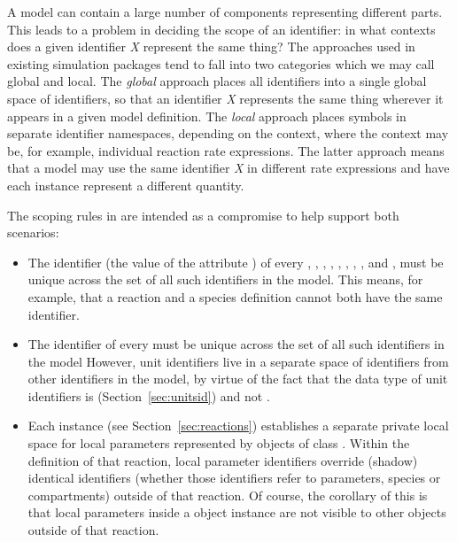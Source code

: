 A model can contain a large number of components representing
different parts.  This leads to a problem in deciding the scope of
an identifier: in what contexts does a given identifier \emph{X}
represent the same thing?  The approaches used in existing
simulation packages tend to fall into two categories which we may
call global and local.  The \emph{global} approach places all
identifiers into a single global space of identifiers, so that an
identifier \emph{X} represents the same thing wherever it appears
in a given model definition.  The \emph{local} approach places
symbols in separate identifier namespaces, depending on the
context, where the context may be, for example, individual
reaction rate expressions.  The latter approach means that a model
may use the same identifier \emph{X} in different rate expressions
and have each instance represent a different quantity.

The scoping rules in \sbmlthree are intended as a compromise to help
support both scenarios:
\begin{itemize}
  
\item The identifier (\ie the value of the attribute ) of
  every \FunctionDefinition, 
  \Compartment, \Species, \Parameter, \Reaction,
  \SpeciesReference, \ModifierSpeciesReference, \Event, and
  \Model, must be unique across the set of all such identifiers in
  the model.  This means, for example, that a reaction and a
  species definition cannot both have the same identifier.

\item The identifier of every \UnitDefinition must be unique
  across the set of all such identifiers in the model   However,
  unit identifiers live in a separate space of identifiers from
  other identifiers in the model, by virtue of the fact that the
  data type of unit identifiers is 
  (Section~\ref{sec:unitsid}) and not .
  
\item Each \Reaction instance (see Section~\ref{sec:reactions})
  establishes a separate private local space for local parameters
  represented by objects of class \LocalParameter.  Within the
  definition of that reaction, local parameter identifiers
  override (shadow) identical identifiers (whether those
  identifiers refer to parameters, species or compartments)
  outside of that reaction.  Of course, the corollary of this is
  that local parameters inside a \Reaction object instance are not
  visible to other objects outside of that reaction.

\end{itemize}


